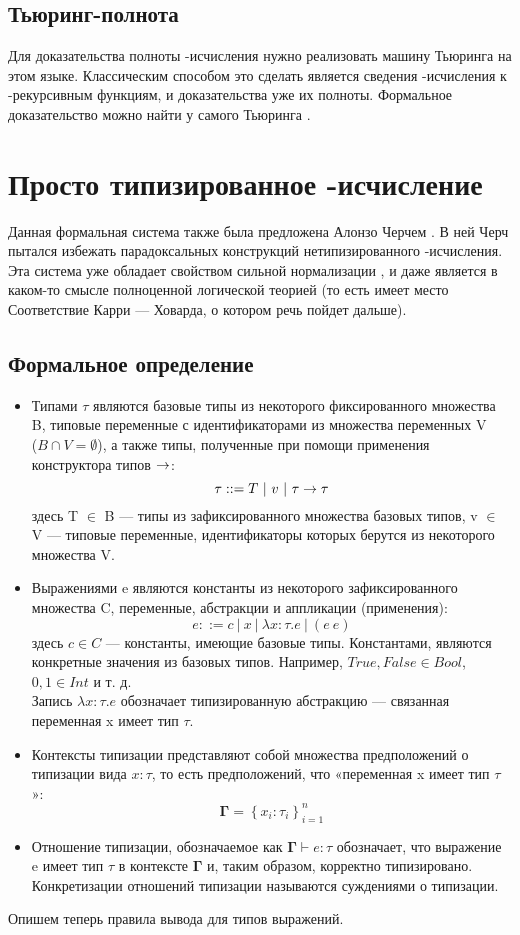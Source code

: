 \subsection{Тьюринг-полнота}
Для доказательства полноты \textlambda-исчисления нужно реализовать машину Тьюринга на этом языке. Классическим способом это сделать является
сведения \textlambda-исчисления к \textmu-рекурсивным функциям, и доказательства уже их полноты. Формальное доказательство можно найти у самого Тьюринга
\cite{Turing01}.

\section{Просто типизированное \textlambda-исчисление}
Данная формальная система также была предложена Алонзо Черчем \cite{Church03}. В ней Черч пытался избежать парадоксальных конструкций 
нетипизированного \textlambda-исчисления. Эта система уже обладает свойством сильной нормализации \cite{Tait01},  
и даже является в каком-то смысле полноценной  логической теорией (то есть имеет место Соответствие Карри — Ховарда, о котором речь пойдет дальше). 
\subsection{Формальное определение}
\begin{itemize}
  \item Типами $\tau$ являются базовые типы из некоторого фиксированного множества B,
        типовые переменные с идентификаторами из множества переменных V\\($B \cap V = \emptyset$),
        а также типы, полученные при помощи применения конструктора типов $\rightarrow$: \\
        $$\tau ::= T\ |\ v\ |\ \tau \rightarrow \tau$$
        здесь T $\in$ B — типы из зафиксированного множества базовых типов, v $\in$ V — типовые переменные,
        идентификаторы которых берутся из некоторого множества V.
  \item Выражениями e являются константы из некоторого зафиксированного множества C,
        переменные, абстракции и аппликации (применения):
        $$e ::= c\ |\ x\ |\ \lambda x : \tau.e\ |\ (e\ e)$$
        здесь $c \in C$ — константы, имеющие базовые типы.
        Константами, являются конкретные значения из базовых типов.
        Например, $True, False \in Bool$, $0, 1 \in Int$ и т. д. \\
        Запись $\lambda x : \tau.e$ обозначает типизированную абстракцию —
        связанная переменная x имеет тип $\tau$.
  \item Контексты типизации представляют собой множества предположений о типизации вида $x : \tau$,
        то есть предположений, что «переменная x имеет тип $\tau$»:
        $$\mathbf{\Gamma}=\left\{x_{i}: \tau_{i}\right\}_{i=1}^{n}$$
  \item Отношение типизации, обозначаемое как $\mathbf{\Gamma} \vdash e: \tau$ обозначает, что выражение
        e имеет тип $\tau$ в контексте $\mathbf{\Gamma}$ и, таким образом, корректно типизировано.
        Конкретизации отношений типизации называются суждениями о типизации.
\end{itemize}
Опишем теперь правила вывода для типов выражений.
